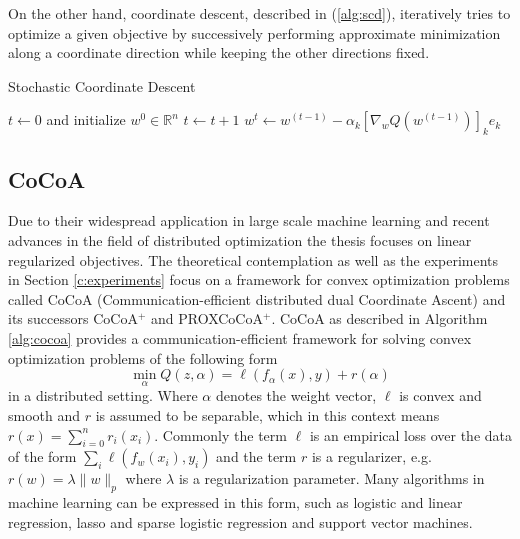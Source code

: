 On the other hand, coordinate descent, described in (\ref{alg:scd}), iteratively tries to optimize a given objective by successively performing approximate minimization along a coordinate direction while keeping the other directions fixed.
\begin{algorithm}
\caption{Stochastic Coordinate Descent}\label{alg:scd}
\begin{algorithmic}[1]
\State $t\gets 0$ and initialize $w^0 \in \mathbb{R}^n$
\Repeat
\State $t \gets t + 1$
\State $w^{t} \gets w^{(t-1)} - \alpha_k[\nabla_wQ(w^{(t-1)})]_ke_k$
\EndFor
{}
\end{algorithmic}
\end{algorithm}


\subsection{CoCoA}
Due to their widespread application in large scale machine learning and recent advances in the field of distributed optimization the thesis focuses on linear regularized objectives.
The theoretical contemplation as well as the experiments in Section \ref{c:experiments} focus on a framework for convex optimization problems called CoCoA (Communication-efficient distributed dual Coordinate Ascent) \cite{Jaggi2014} and its successors CoCoA$^+$\cite{smith2015l1} and PROXCoCoA$^+$\cite{smith2016cocoa}.
CoCoA as described in Algorithm \ref{alg:cocoa} provides a communication-efficient framework for solving convex optimization problems of the following form
\begin{equation}
\min_{\alpha} Q(z,\alpha) = \ell(f_\alpha(x),y) + r(\alpha)
\label{eqn:lin_loss}
\end{equation}
in a distributed setting.
Where $\alpha$ denotes the weight vector, $\ell$ is convex and smooth and $r$ is assumed to be separable, which in this context means $r(x) = \sum_{i=0}^nr_i(x_i)$.
Commonly the term $\ell$ is an empirical loss over the data of the form $\sum_{i} \ell(f_w(x_i), y_i)$ and the term $r$ is a regularizer, e.g. $r(w) = \lambda\|w\|_p$ where $\lambda$ is a regularization parameter.
Many algorithms in machine learning can be expressed in this form, such as logistic and linear regression, lasso and sparse logistic regression and support vector machines.

